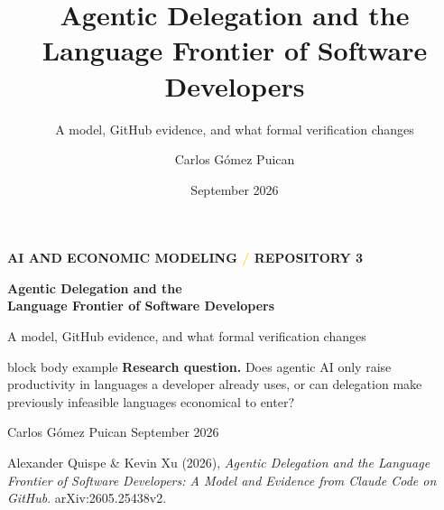 \documentclass[aspectratio=169,10pt]{beamer}
\title{Agentic Delegation and the Language Frontier of Software Developers}
\subtitle{A model, GitHub evidence, and what formal verification changes}
\author{Carlos G\'omez Puican}
\date{September 2026}
\begin{document}
\begin{frame}[plain]

  \vspace{0.72cm}
  {\color{Teal}\small\bfseries AI AND ECONOMIC MODELING \hspace{0.6em}\textcolor{Gold}{/}\hspace{0.6em} REPOSITORY 3}

  \vspace{0.48cm}
  {\color{Ink}\fontsize{22}{25}\selectfont\bfseries
    Agentic Delegation and the\\[-0.05cm]
    Language Frontier of Software Developers\par}

  \vspace{0.18cm}
  {\color{Slate}\large A model, GitHub evidence, and what formal verification changes\par}

  \vspace{0.46cm}
  \begin{beamercolorbox}[wd=0.83\textwidth,sep=0.20cm,rounded=true]{block body example}
    \textbf{Research question.} Does agentic AI only raise productivity in languages a developer already uses, or can delegation make previously infeasible languages economical to enter?
  \end{beamercolorbox}

  \vfill
  {\small Carlos G\'omez Puican \hspace{0.5em}\textcolor{Gold}{\textbullet}\hspace{0.5em} September 2026}\par
  \vspace{0.15cm}
  {\footnotesize\color{Slate}Alexander Quispe \& Kevin Xu (2026), \emph{Agentic Delegation and the Language Frontier of Software Developers: A Model and Evidence from Claude Code on GitHub}. arXiv:2605.25438v2.}
  \vspace{0.26cm}
\end{frame}
\end{document}
